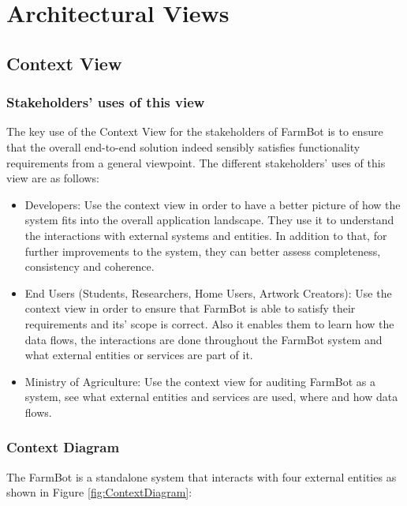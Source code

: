 \chapter{Architectural Views} \label{ArchitecturalViews}


\section{Context View}

\subsection{Stakeholders’ uses of this view}
The key use of the Context View for the stakeholders of \cite{farmbot} FarmBot is to ensure that the overall end-to-end solution indeed sensibly satisfies functionality requirements from a general viewpoint. The different stakeholders' uses of this view are as follows:
\begin{itemize}
    \item Developers: Use the context view in order to have a better picture of how the system fits into the overall application landscape. They use it to understand the interactions with external systems and entities. In addition to that, for further improvements to the system, they can better assess completeness, consistency and coherence.
    \item End Users (Students, Researchers, Home Users, Artwork Creators): Use the context view in order to ensure that FarmBot is able to satisfy their requirements and its' scope is correct. Also it enables them to learn how the data flows, the interactions are done throughout the FarmBot system and what external entities or services are part of it.
    \item Ministry of Agriculture: Use the context view for auditing FarmBot as a system, see what external entities and services are used, where and how data flows.
\end{itemize}

\subsection{Context Diagram}


The FarmBot is a standalone system that interacts with four external entities as shown in Figure \ref{fig:ContextDiagram}:

